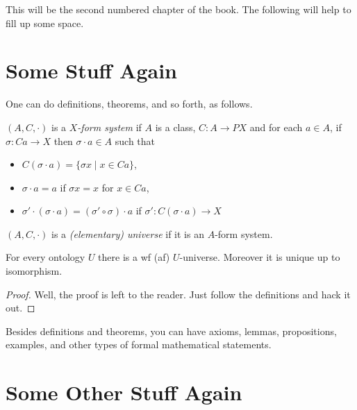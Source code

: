



This will be the second numbered chapter of the book.  The following
will help to fill up some space.



\section{Some Stuff Again}


One can do definitions, theorems, and so forth, as
follows.

\begin{definition}
$(A,C,\cdot)$ is a {\em $X$-form system\/} if $A$ is
a class, $C:A\to PX$ and for each $a\in A$, if $\sigma:Ca\to X$ then
$\sigma\cdot a \in A$ such that
    \begin{itemize}
    \item $C(\sigma\cdot a) = \{\sigma x\mid x\in Ca\}$,
    \item $\sigma\cdot a  = a $ if $\sigma x = x$ for $x\in Ca$,
    \item $\sigma'\cdot(\sigma\cdot a ) = (\sigma'\circ\sigma)\cdot a$
          if  $\sigma':C(\sigma\cdot a) \to X$
    \end{itemize}
\end{definition}

\begin{definition}
$(A,C,\cdot) $ is a {\em (elementary) universe} if it is an $A$-form system.
\end{definition}

\begin{theorem}\label{universe-existence-theorem}
For every ontology $U$ there is a wf
(af) $U$-universe.  Moreover it is unique up to isomorphism.
\end{theorem}

\begin{proof}
Well, the proof is left to the reader.  Just follow the definitions
and hack it out.
\end{proof}

\noindent
Besides definitions and theorems, you can have axioms, lemmas,
propositions, examples, and other types of formal
mathematical statements.



\section{Some Other Stuff Again}


